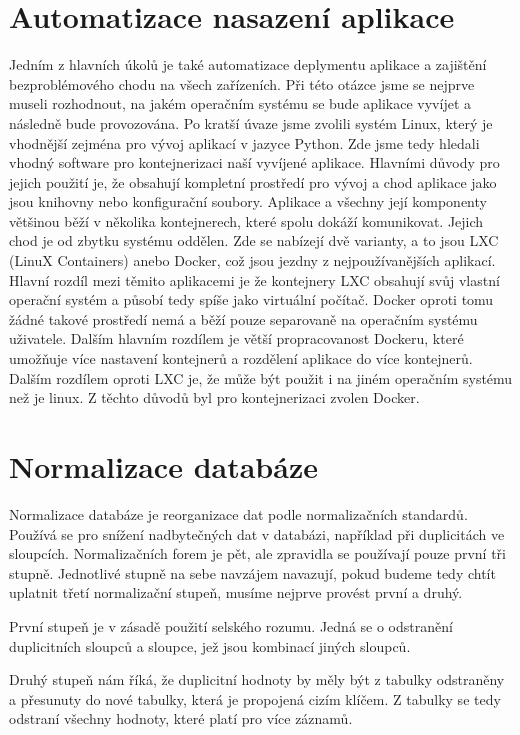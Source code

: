 \section{Automatizace nasazení aplikace}

Jedním z hlavních úkolů je také automatizace deplymentu aplikace a
zajištění bezproblémového chodu na všech zařízeních. Při této otázce
jsme se nejprve museli rozhodnout, na jakém operačním systému se bude
aplikace vyvíjet a následně bude provozována. Po kratší úvaze jsme
zvolili systém Linux, který je vhodnější zejména pro vývoj aplikací v
jazyce Python. Zde jsme tedy hledali vhodný software pro
kontejnerizaci naší vyvíjené aplikace. Hlavními důvody pro jejich
použití je, že obsahují kompletní prostředí pro vývoj a chod aplikace
jako jsou knihovny nebo konfigurační soubory. Aplikace a všechny její
komponenty většinou běží v několika kontejnerech, které spolu dokáží
komunikovat. Jejich chod je od zbytku systému oddělen. Zde se nabízejí
dvě varianty, a to jsou LXC (LinuX Containers) anebo Docker, což jsou
jezdny z nejpoužívanějších aplikací. Hlavní rozdíl mezi těmito
aplikacemi je že kontejnery LXC obsahují svůj vlastní operační systém
a působí tedy spíše jako virtuální počítač. Docker oproti tomu žádné
takové prostředí nemá a běží pouze separovaně na operačním systému
uživatele. Dalším hlavním rozdílem je větší propracovanost Dockeru,
které umožňuje více nastavení kontejnerů a rozdělení aplikace do více
kontejnerů. Dalším rozdílem oproti LXC je, že může být použit i na
jiném operačním systému než je linux. Z těchto důvodů byl pro
kontejnerizaci zvolen Docker.

\section{Normalizace databáze}

Normalizace databáze je reorganizace dat podle normalizačních standardů. 
Používá se pro snížení nadbytečných dat v databázi, například při duplicitách 
ve sloupcích. Normalizačních forem je pět, ale zpravidla se používají pouze 
první tři stupně. Jednotlivé stupně na sebe navzájem navazují, pokud budeme 
tedy chtít uplatnit třetí normalizační stupeň, musíme nejprve provést první a druhý.

První stupeň je v zásadě použití selského rozumu. Jedná se o odstranění 
duplicitních sloupců a sloupce, jež jsou kombinací jiných sloupců.

Druhý stupeň nám říká, že duplicitní hodnoty by měly být z tabulky odstraněny 
a přesunuty do nové tabulky, která je propojená cizím klíčem. Z tabulky se tedy 
odstraní všechny hodnoty, které platí pro více záznamů.

